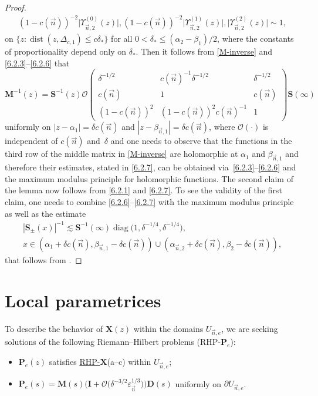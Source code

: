 \documentclass[pdftex]{sigma}
\numberwithin{equation}{section}
\newcommand{\dist}{\operatorname{dist}}
\newcommand{\diag}{\operatorname{diag}}
\newcommand{\n}{{\vec n}}
\newcommand{\rhx} {\textnormal{RHP}-${\boldsymbol X}$}
\newcommand{\rhp} {\textnormal{RHP}-${\boldsymbol P}$}
\begin{document}
\begin{proof}
\begin{gather}
(1-c(\n))^{-2}\big|\Upsilon_{\n,2}^{(0)}(z)\big|, (1-c(\n))^{-2}\big|\Upsilon_{\n,2}^{(1)}(z)\big|, \big|\Upsilon_{\n,2}^{(2)}(z)\big| \sim 1,\label{6.2.6}
\end{gather}
on $ \{z : \dist(z,\Delta_{c,1})\leq c\delta_*\} $ for all $ 0<\delta_*\leq (\alpha_2-\beta_1)/2 $, where the constants of proportionality depend only on $ \delta_* $. Then it follows from \eqref{M-inverse} and \eqref{6.2.3}--\eqref{6.2.6} that
\begin{equation}
\label{6.2.7}
\boldsymbol M^{-1}(z) = \boldsymbol S^{-1}(z) \boldsymbol{\mathcal O} \begin{pmatrix} \delta^{-1/2} & c(\n)^{-1}\delta^{-1/2} & \delta^{-1/2} \\ c(\n) & 1 & c(\n) \\ (1-c(\n))^2 & (1-c(\n))^2 c(\n)^{-1} & 1 \end{pmatrix} \boldsymbol S(\infty)
\end{equation}
uniformly on $ |z-\alpha_1| = \delta c(\n) $ and $ |z-\beta_{\n,1}| = \delta c(\n) $, where $\boldsymbol{\mathcal O}(\cdot) $ is independent of $ c(\n) $ and~$ \delta $ and one needs to observe that the functions in the third row of the middle matrix in \eqref{M-inverse} are holomorphic at $ \alpha_1 $ and $ \beta_{\n,1} $ and therefore their estimates, stated in \eqref{6.2.7}, can be obtained via~\eqref{6.2.3}--\eqref{6.2.6} and the maximum modulus principle for holomorphic functions. The second claim of the lemma now follows from \eqref{6.2.1} and \eqref{6.2.7}. To see the validity of the first claim, one needs to combine \eqref{6.2.6}--\eqref{6.2.7} with the maximum modulus principle as well as the estimate
\begin{gather*}
|\boldsymbol S_\pm(x)|^{-1} \lesssim \boldsymbol S^{-1}(\infty) \diag\bigl( 1,\delta^{-1/4},\delta^{-1/4} \bigr), \\
 x\in (\alpha_1+\delta c(\n),\beta_{\n,1}-\delta c(\n)) \cup (\alpha_{\n,2}+\delta c(\n),\beta_2-\delta c(\n)),
\end{gather*}
that follows from \cite[Lemma~5.4]{ApDenYa21}.
\end{proof}


\section{Local parametrices}

To describe the behavior of $ \boldsymbol X(z) $ within the domains $ U_{\n,e} $, we are seeking solutions of the following Riemann--Hilbert problems (\rhp$_e$):
\begin{itemize}\itemsep=0pt\setlength{\leftskip}{0.1cm}\label{rhp}
\item[(a--c)] $\boldsymbol P_e(z)$ satisfies \hyperref[rhx]{\rhx}(a--c) within $U_{\n,e}$;
\item[(d)] $\boldsymbol P_e(s)=\boldsymbol M(s)\bigl(\boldsymbol I+\boldsymbol{\mathcal O} \bigl( \delta^{-3/2} \varepsilon_\n^{1/3} \bigr)\bigr)\boldsymbol D(s)$ uniformly on $\partial U_{\n,e} $.
\end{itemize}
\end{document}
